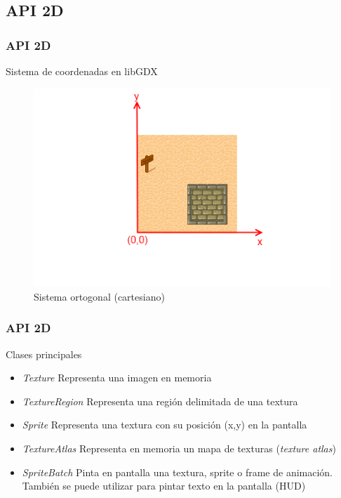 \documentclass[xcolor={dvipsnames}]{beamer}
\begin{document}
\subsection{API 2D}
\begin{frame}\frametitle{API 2D}
	\begin{block}{Sistema de coordenadas en \textcolor{resalta}{libGDX}}
    \begin{figure}
    \includegraphics[scale=0.5]{images/xy}
    \caption{Sistema ortogonal (cartesiano)}
    \end{figure}
    \end{block}
\end{frame}

\begin{frame}\frametitle{API 2D}
	\begin{block}{Clases principales}
    \begin{itemize}
        \item \emph{\textcolor{resalta}{Texture}} Representa una imagen en memoria
        \item \emph{\textcolor{resalta}{TextureRegion}} Representa una región delimitada de una textura
        \item \emph{\textcolor{resalta}{Sprite}} Representa una textura con su posición (x,y) en la pantalla
		\item \emph{\textcolor{resalta}{TextureAtlas}} Representa en memoria un mapa de texturas (\emph{texture atlas})
        \item \emph{\textcolor{resalta}{SpriteBatch}} Pinta en pantalla una textura, sprite o frame de animación. También se puede utilizar
        para pintar texto en la pantalla (HUD)
    \end{itemize}
    \end{block}
\end{frame}
\end{document}
